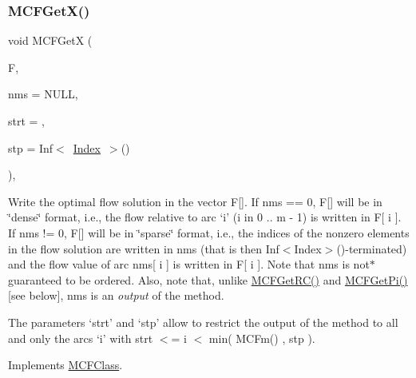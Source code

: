 \subsubsection{\texorpdfstring{M\+C\+F\+Get\+X()}{MCFGetX()}\hspace{0.1cm}{\footnotesize\ttfamily [3/3]}}
{\footnotesize\ttfamily void M\+C\+F\+GetX (\begin{DoxyParamCaption}\item[{\mbox{\hyperlink{class_m_c_f_class_a9dae1f1a39c208ce3c2b337cd5bb3d00}{F\+Row}}}]{F,  }\item[{\mbox{\hyperlink{class_m_c_f_class_ace3388eb329ff0551a0b86b6c67e33d8}{Index\+\_\+\+Set}}}]{nms = {\ttfamily NULL},  }\item[{\mbox{\hyperlink{class_m_c_f_class_a76aaabb20535c51a2752b93f6c38fe54}{c\+Index}}}]{strt = {},  }\item[{\mbox{\hyperlink{class_m_c_f_class_ad53d6229d7ec28555a9c9c2fd9abf773}{Index}}}]{stp = {\ttfamily Inf$<$~\mbox{\hyperlink{class_m_c_f_class_ad53d6229d7ec28555a9c9c2fd9abf773}{Index}}~$>$()} }\end{DoxyParamCaption})\hspace{0.3cm}{\ttfamily [override]}, {\ttfamily [virtual]}}

Write the optimal flow solution in the vector F\mbox{[}\mbox{]}. If nms == 0, F\mbox{[}\mbox{]} will be in \char`\"{}dense\char`\"{} format, i.\+e., the flow relative to arc `i' (i in 0 .. m -\/ 1) is written in F\mbox{[} i \mbox{]}. If nms != 0, F\mbox{[}\mbox{]} will be in \char`\"{}sparse\char`\"{} format, i.\+e., the indices of the nonzero elements in the flow solution are written in nms (that is then Inf$<$\+Index$>$()-\/terminated) and the flow value of arc nms\mbox{[} i \mbox{]} is written in F\mbox{[} i \mbox{]}. Note that nms is not$\ast$ guaranteed to be ordered. Also, note that, unlike \mbox{\hyperlink{class_m_c_f_class_af027cee8179a876a4879c73820c380d1}{M\+C\+F\+Get\+R\+C()}} and \mbox{\hyperlink{class_m_c_f_class_a8f1a95d5c707f83ffc6aecba1e7e0e10}{M\+C\+F\+Get\+Pi()}} \mbox{[}see below\mbox{]}, nms is an {\itshape output} of the method.

The parameters `strt' and `stp' allow to restrict the output of the method to all and only the arcs `i' with strt $<$= i $<$ min( M\+C\+Fm() , stp ). 

Implements \mbox{\hyperlink{class_m_c_f_class_a884f1180138ddf3df909347b1c85428c}{M\+C\+F\+Class}}.

\mbox{\label{class_m_c_f_cplex_aed95a5978f1e167d3dae5fc93d32e3aa}} 
